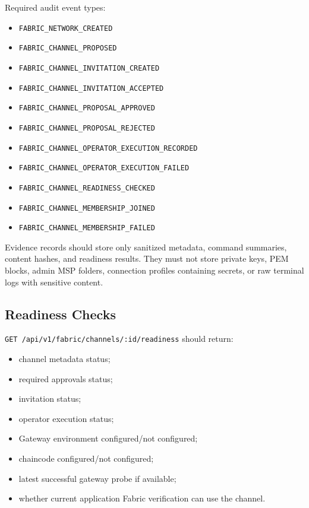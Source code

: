 Required audit event types:

\begin{itemize}
  \item \texttt{FABRIC\_NETWORK\_CREATED}
  \item \texttt{FABRIC\_CHANNEL\_PROPOSED}
  \item \texttt{FABRIC\_CHANNEL\_INVITATION\_CREATED}
  \item \texttt{FABRIC\_CHANNEL\_INVITATION\_ACCEPTED}
  \item \texttt{FABRIC\_CHANNEL\_PROPOSAL\_APPROVED}
  \item \texttt{FABRIC\_CHANNEL\_PROPOSAL\_REJECTED}
  \item \texttt{FABRIC\_CHANNEL\_OPERATOR\_EXECUTION\_RECORDED}
  \item \texttt{FABRIC\_CHANNEL\_OPERATOR\_EXECUTION\_FAILED}
  \item \texttt{FABRIC\_CHANNEL\_READINESS\_CHECKED}
  \item \texttt{FABRIC\_CHANNEL\_MEMBERSHIP\_JOINED}
  \item \texttt{FABRIC\_CHANNEL\_MEMBERSHIP\_FAILED}
\end{itemize}

Evidence records should store only sanitized metadata, command summaries, content hashes, and readiness results. They must not store private keys, PEM blocks, admin MSP folders, connection profiles containing secrets, or raw terminal logs with sensitive content.

\subsection{Readiness Checks}

\texttt{GET /api/v1/fabric/channels/:id/readiness} should return:

\begin{itemize}
  \item channel metadata status;
  \item required approvals status;
  \item invitation status;
  \item operator execution status;
  \item Gateway environment configured/not configured;
  \item chaincode configured/not configured;
  \item latest successful gateway probe if available;
  \item whether current application Fabric verification can use the channel.
\end{itemize}

